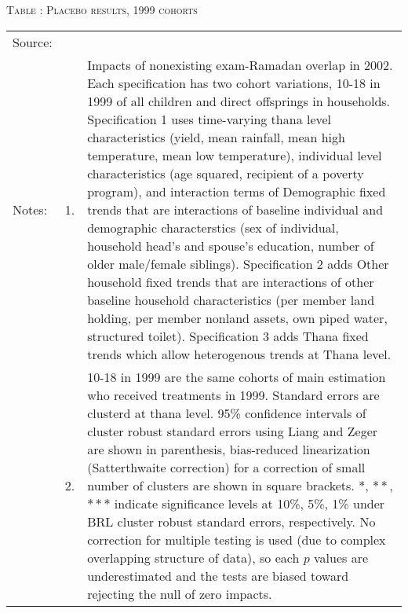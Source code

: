 \begin{table}
\hfil\textsc{\footnotesize Table \thetable: Placebo results, 1999 cohorts\label{PlaceboResults1999Table}}\\
\setlength{\tabcolsep}{1pt}
\renewcommand{\arraystretch}{.55}
\hfil

\renewcommand{\arraystretch}{1}
\hfil\begin{tabular}{>{\hfill\scriptsize}p{1cm}<{}>{\hfill\scriptsize}p{.5cm}<{}>{\scriptsize}p{12cm}<{\hfill}}
Source:& \multicolumn{2}{l}{\scriptsize Compiled from IFPRI data. Various cohorts.}\\[-1ex]
Notes:& 1. & Impacts of nonexisting exam-Ramadan overlap in 2002. Each specification has two cohort variations, \textsf{10-18 in 1999} of all children and direct offsprings in households. \textsf{Specification 1} uses time-varying thana level characteristics (yield, mean rainfall, mean high temperature, mean low temperature), individual level characteristics (age squared, recipient of a poverty program), and interaction terms of \textsf{Demographic fixed trends} that are interactions of baseline individual and demographic characterstics (sex of individual, household head's and spouse's education, number of older male/female siblings). \textsf{Specification 2} adds \textsf{Other household fixed trends} that are interactions of other baseline household characteristics (per member land holding, per member nonland assets, own piped water, structured toilet). \textsf{Specification 3} adds \textsf{Thana fixed trends} which allow heterogenous trends at Thana level. \\[-1ex]
& 2. & \textsf{10-18 in 1999} are the same cohorts of main estimation who received treatments in 1999. Standard errors are clusterd at thana level. 95\% confidence intervals of cluster robust standard errors using Liang and Zeger are shown in parenthesis, bias-reduced linearization (Satterthwaite correction) for a correction of small number of clusters are shown in square brackets. $*$, $**$, $***$ indicate significance levels at 10\%, 5\%, 1\% under BRL cluster robust standard errors, respectively. No correction for multiple testing is used (due to complex overlapping structure of data), so each $p$ values are underestimated and the tests are biased toward rejecting the null of zero impacts. 
\end{tabular}
\end{table}

